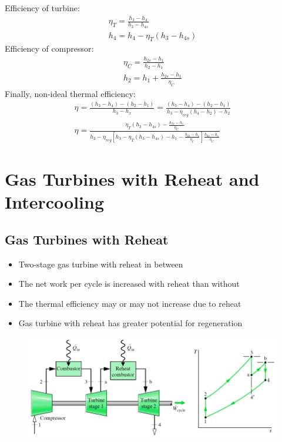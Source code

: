 \documentclass[class=report, crop=false, 12pt,a4paper]{standalone}
\numberwithin{equation}{section}
\begin{document}
Efficiency of turbine:
\begin{gather}
  \eta_T = \frac{h_3-h_4}{h_3-h_{4s}} \\[5pt]
  h_4 = h_4-\eta_T(h_3-h_{4s})
\end{gather}
Efficiency of compressor:
\begin{gather}
  \eta_C = \frac{h_{2s}-h_1}{h_2-h_1} \\[5pt]
  h_2 = h_1 + \frac{h_{2s}-h_1}{\eta_C}
\end{gather}
Finally, non-ideal thermal efficiency: 
\begin{gather}
  \eta = \frac{(h_3-h_4)-(h_2-h_1)}{h_3-h_x} = \frac{(h_3-h_4)-(h_2-h_1)}{h_3-\eta_{reg}(h_4-h_2)-h_2} \\[5pt]
  \eta = \frac{\eta_T(h_3-h_{4s})-\frac{h_{2s}-h_1}{\eta_C}}{h_3-\eta_{reg}\left[h_3-\eta_T(h_3-h_{4s})-h_1-\frac{h_{2s}-h_1}{\eta_C}\right]\frac{h_{2s}-h_1}{\eta_C}  }
\end{gather}
\section{Gas Turbines with Reheat and Intercooling}
\subsection{Gas Turbines with Reheat}
\begin{itemize}[noitemsep]
  \item Two-stage gas turbine with reheat in between
  \item The net work per cycle is increased with reheat than without
  \item The thermal efficiency may or may not increase due to reheat
  \item Gas turbine with reheat has greater potential for regeneration
\end{itemize}
\begin{figure}[H]
  \centering
  \includegraphics[width = 1 \textwidth]{../img/diagram169.png}
  \caption{}
\end{figure}
\end{document}

